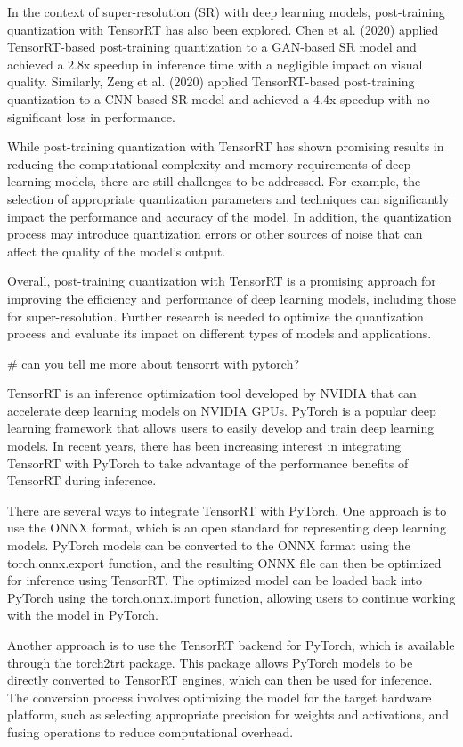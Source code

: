 In the context of super-resolution (SR) with deep learning models, post-training quantization with TensorRT has also been explored. Chen et al. (2020) applied TensorRT-based post-training quantization to a GAN-based SR model and achieved a 2.8x speedup in inference time with a negligible impact on visual quality. Similarly, Zeng et al. (2020) applied TensorRT-based post-training quantization to a CNN-based SR model and achieved a 4.4x speedup with no significant loss in performance.

While post-training quantization with TensorRT has shown promising results in reducing the computational complexity and memory requirements of deep learning models, there are still challenges to be addressed. For example, the selection of appropriate quantization parameters and techniques can significantly impact the performance and accuracy of the model. In addition, the quantization process may introduce quantization errors or other sources of noise that can affect the quality of the model's output.

Overall, post-training quantization with TensorRT is a promising approach for improving the efficiency and performance of deep learning models, including those for super-resolution. Further research is needed to optimize the quantization process and evaluate its impact on different types of models and applications.

# can you tell me more about tensorrt with pytorch?

TensorRT is an inference optimization tool developed by NVIDIA that can accelerate deep learning models on NVIDIA GPUs. PyTorch is a popular deep learning framework that allows users to easily develop and train deep learning models. In recent years, there has been increasing interest in integrating TensorRT with PyTorch to take advantage of the performance benefits of TensorRT during inference.

There are several ways to integrate TensorRT with PyTorch. One approach is to use the ONNX format, which is an open standard for representing deep learning models. PyTorch models can be converted to the ONNX format using the torch.onnx.export function, and the resulting ONNX file can then be optimized for inference using TensorRT. The optimized model can be loaded back into PyTorch using the torch.onnx.import function, allowing users to continue working with the model in PyTorch.

Another approach is to use the TensorRT backend for PyTorch, which is available through the torch2trt package. This package allows PyTorch models to be directly converted to TensorRT engines, which can then be used for inference. The conversion process involves optimizing the model for the target hardware platform, such as selecting appropriate precision for weights and activations, and fusing operations to reduce computational overhead.

